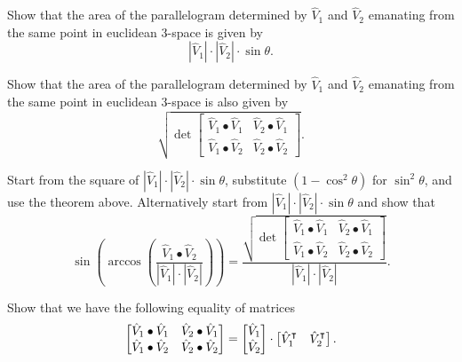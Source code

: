 \documentclass{ximera}
\begin{document}
\begin{problem}
Show that the area of the parallelogram determined by $\hat{V}_{1}$ and
$\hat{V}_{2}$ emanating from the same point in euclidean $3$-space is given by%
\[
|\hat{V}_{1}|\cdot|\hat{V}_{2}|\cdot\sin\theta.
\]
\end{problem}

\begin{problem}
\label{9}Show that the area of the parallelogram determined by $\hat{V}_{1}$
and $\hat{V}_{2}$ emanating from the same point in euclidean $3$-space is also
given by%
\[
\sqrt{\det
\begin{bmatrix}
\hat{V}_{1}\bullet\hat{V}_{1} & \hat{V}_{2}\bullet\hat{V}_{1}\\
\hat{V}_{1}\bullet\hat{V}_{2} & \hat{V}_{2}\bullet\hat{V}_{2}%
\end{bmatrix}}.
\]

\begin{hint}
Start from the square of
$|\hat{V}_{1}|\cdot|\hat{V}_{2}|\cdot\sin\theta$, substitute $\left(
1-\cos^{2}\theta\right)$ for $\sin^{2}\theta$, and use the theorem
above. Alternatively start from
$|\hat{V}_{1}|\cdot|\hat{V}_{2}|\cdot\sin\theta$ and show that%
\[
\sin\left(  \arccos\left(  \frac{\hat{V}_{1}\bullet\hat{V}%
_{2}}{\left\vert \hat{V}_{1}\right\vert \cdot\left\vert \hat{V}_{2}\right\vert
}\right)  \right)  
=\frac{\sqrt{\det
    \begin{bmatrix}
      \hat{V}_{1}\bullet\hat{V}_{1} & \hat{V}_{2}\bullet\hat{V}_{1}\\
      \hat{V}_{1}\bullet\hat{V}_{2} & \hat{V}_{2}\bullet\hat{V}_{2}
    \end{bmatrix}
  }
}{\left\vert\hat{V}_{1}\right\vert \cdot\left\vert
  \hat{V}_{2}\right\vert }.
\]
\end{hint}

\end{problem}

\begin{problem}
Show that we have the following equality of matrices%
\[
\begin{bmatrix}
\hat{V}_{1}\bullet\hat{V}_{1} & \hat{V}_{2}\bullet\hat{V}_{1}\\
\hat{V}_{1}\bullet\hat{V}_{2} & \hat{V}_{2}\bullet\hat{V}_{2}%
\end{bmatrix}
=
\begin{bmatrix}
\hat{V}_{1} \\
\hat{V}_{2}
\end{bmatrix}
\cdot
\begin{bmatrix}
\hat{V}_{1}^\transpose  & \hat{V}_{2}^\transpose 
\end{bmatrix}.
\]

\end{problem}
\end{document}
